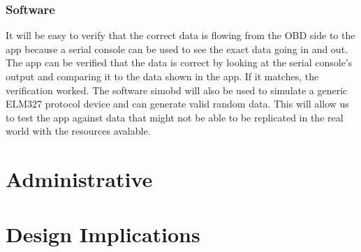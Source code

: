 \documentclass[12pt,letterpaper]{article}
\begin{document}
\subsubsection{Software}
It will be easy to verify that the correct data is flowing from the OBD side to the app because a serial console can be used to see the exact data going in and out. The app can be verified that the data is correct by looking at the serial console's output and comparing it to the data shown in the app. If it matches, the verification worked. The software simobd will also be used to simulate a generic ELM327 protocol device and can generate valid random data. This will allow us to test the app against data that might not be able to be replicated in the real world with the resources avalable. 

\section{Administrative}


\section{Design Implications}
\end{document}
